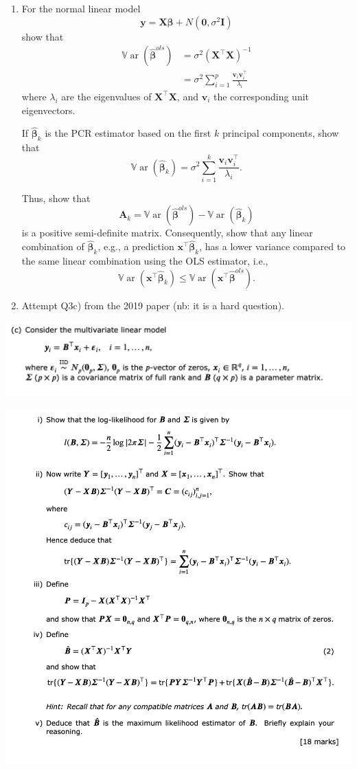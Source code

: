 \documentclass[
]{book}
\theoremstyle{definition}
\theoremstyle{definition}
\theoremstyle{definition}
\theoremstyle{definition}
\theoremstyle{remark}
\begin{document}
\begin{enumerate}
\def\labelenumi{\arabic{enumi}.}
\setcounter{enumi}{2}
\item
  For the normal linear model
  \[\mathbf y= \mathbf X\boldsymbol \beta+ N({\boldsymbol 0}, \sigma^2 \mathbf I)\]
  show that
  \begin{align}
  {\mathbb{V}\operatorname{ar}}(\hat{\boldsymbol \beta}^{ols}) &= \sigma^2 (\mathbf X^\top \mathbf X)^{-1}\\
  &= \sigma^2\sum_{i=1}^p \frac{\mathbf v_i \mathbf v_i^\top}{\lambda_i}
  \end{align}
  where \(\lambda_i\) are the eigenvalues of \(\mathbf X^\top \mathbf X\), and \(\mathbf v_i\) the corresponding unit eigenvectors.

  If \(\hat{\boldsymbol \beta}_k\) is the PCR estimator based on the first \(k\) principal components, show that
  \[{\mathbb{V}\operatorname{ar}}(\hat{\boldsymbol \beta}_k) = \sigma^2 \sum_{i=1}^k \frac{\mathbf v_i \mathbf v_i^\top}{\lambda_i}.\]

  Thus, show that \[\mathbf A_k = {\mathbb{V}\operatorname{ar}}(\hat{\boldsymbol \beta}^{ols})-{\mathbb{V}\operatorname{ar}}(\hat{\boldsymbol \beta}_k)\] is a positive semi-definite matrix. Consequently, show that any linear combination of \(\hat{\boldsymbol \beta}_k\), e.g., a prediction \(\mathbf x^\top \hat{\boldsymbol \beta}_k\), has a lower variance compared to the same linear combination using the OLS estimator, i.e.,
  \[{\mathbb{V}\operatorname{ar}}(\mathbf x^\top \hat{\boldsymbol \beta}_k)\leq {\mathbb{V}\operatorname{ar}}(\mathbf x^\top \hat{\boldsymbol \beta}^{ols}).\]
\item
  Attempt Q3c) from the 2019 paper (nb: it is a hard question).
\end{enumerate}

\includegraphics{figs/LM_2018_19_Q3c_ii.png}

\includegraphics{figs/LM_2018_19_Q3c_i.png}

  
\end{document}

